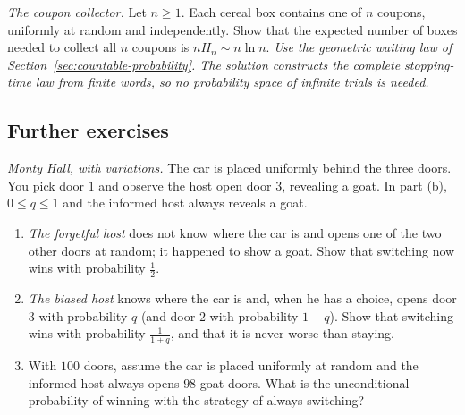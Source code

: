 \begin{exercise}[$\star\star\star$]\label{ex:coupon}
\emph{The coupon collector.} Let $n\ge1$. Each cereal box contains one of $n$ coupons, uniformly at random and independently. Show that the expected number of boxes needed to collect all $n$
coupons is $nH_n\sim n\ln n$. \emph{Use the geometric waiting law of Section~\ref{sec:countable-probability}. The solution constructs the complete stopping-time law from finite words, so no probability space of infinite trials is needed.}
\end{exercise}

\subsection*{Further exercises}

\begin{exercise}[$\star$]\label{ex:monty}
\emph{Monty Hall, with variations.} The car is placed uniformly behind the three doors. You pick door $1$ and observe the host open door $3$, revealing a goat. In part (b), $0\le q\le1$ and the informed host always reveals a goat.
\begin{enumerate}[label=(\alph*)]
\item \emph{The forgetful host} does not know where the car is and opens one of the two other doors at random; it happened to show a goat. Show that switching now wins with probability $\frac12$.
\item \emph{The biased host} knows where the car is and, when he has a choice, opens door $3$ with probability $q$ (and door $2$ with probability $1-q$). Show that switching wins with probability $\frac1{1+q}$, and that it is never worse than staying.
\item With $100$ doors, assume the car is placed uniformly at random and the informed host always opens $98$ goat doors. What is the unconditional probability of winning with the strategy of always switching?
\end{enumerate}
\end{exercise}

